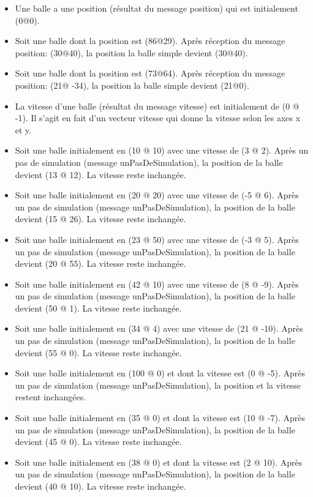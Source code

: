 \documentclass[12pt]{article}
\begin{document}
\begin{itemize}
	\item Une balle a une position (résultat du message {\sf position}) qui est initialement {\sf (0@0)}.
	\item Soit une balle dont la position est {\sf (86@29)}. 
	Après réception du message {\sf position: (30@40)}, la position la balle simple devient {\sf (30@40)}.
	\item Soit une balle dont la position est {\sf (73@64)}. 
	Après réception du message {\sf position: (21@ -34)}, la position la balle simple devient {\sf (21@0)}.
	\item La vitesse d'une balle (résultat du message {\sf vitesse}) est initialement de {\sf (0 @ -1)}. Il s'agit en fait d'un vecteur vitesse qui donne la vitesse selon les axes x et y.
	\item Soit une balle initialement en {\sf (10 @ 10)} avec une vitesse de {\sf (3 @ 2)}. 
	Après un pas de simulation (message {\sf unPasDeSimulation}), la position de la balle devient  {\sf (13 @ 12)}. 
	La vitesse reste inchangée.
	\item Soit une balle initialement en {\sf (20 @ 20)} avec une vitesse de {\sf (-5 @ 6)}. 
	Après un pas de simulation (message {\sf unPasDeSimulation}), la position de la balle devient  {\sf (15 @ 26)}. 
	La vitesse reste inchangée.
	\item Soit une balle initialement en {\sf (23 @ 50)} avec une vitesse de {\sf (-3 @ 5)}. 
	Après un pas de simulation (message {\sf unPasDeSimulation}), la position de la balle devient  {\sf (20 @ 55)}. 
	La vitesse reste inchangée.
	\item Soit une balle initialement en {\sf (42 @ 10)} avec une vitesse de {\sf (8 @ -9)}. 
	Après un pas de simulation (message {\sf unPasDeSimulation}), la position de la balle devient  {\sf (50 @ 1)}. 
	La vitesse reste inchangée.
	\item Soit une balle initialement en {\sf (34 @ 4)} avec une vitesse de {\sf (21 @ -10)}.
	Après un pas de simulation (message {\sf unPasDeSimulation}), la position de la balle devient  {\sf (55 @ 0)}. 
	La vitesse reste inchangée.
	\item Soit une balle initialement en {\sf (100 @ 0)} et dont la vitesse est {\sf (0 @ -5)}. 
	Après un pas de simulation (message {\sf unPasDeSimulation}), la position et la vitesse restent inchangées.
	\item Soit une balle initialement en {\sf (35 @ 0)} et dont la vitesse est {\sf (10 @ -7)}. 
	Après un pas de simulation (message {\sf unPasDeSimulation}), la position de la balle devient  {\sf (45 @ 0)}. 
	La vitesse reste inchangée.
	\item Soit une balle initialement en {\sf (38 @ 0)} et dont la vitesse est {\sf (2 @ 10)}. 
	Après un pas de simulation (message {\sf unPasDeSimulation}), la position de la balle devient  {\sf (40 @ 10)}. La vitesse reste inchangée.
\end{itemize}
\end{document}
